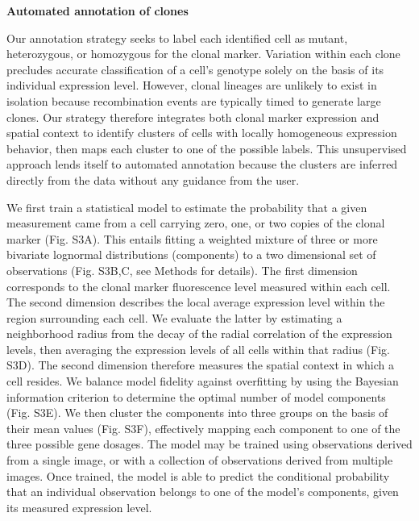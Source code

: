 \textbf{Automated annotation of clones}

Our annotation strategy seeks to label each identified cell as mutant, heterozygous, or homozygous for the clonal marker. Variation within each clone precludes accurate classification of a cell's genotype solely on the basis of its individual expression level. However, clonal lineages are unlikely to exist in isolation because recombination events are typically timed to generate large clones. Our strategy therefore integrates both clonal marker expression and spatial context to identify clusters of cells with locally homogeneous expression behavior, then maps each cluster to one of the possible labels. This unsupervised approach lends itself to automated annotation because the clusters are inferred directly from the data without any guidance from the user.

We first train a statistical model to estimate the probability that a given measurement came from a cell carrying zero, one, or two copies of the clonal marker (Fig. S3A). This entails fitting a weighted mixture of three or more bivariate lognormal distributions (components) to a two dimensional set of observations (Fig. S3B,C, see Methods for details). The first dimension corresponds to the clonal marker fluorescence level measured within each cell. The second dimension describes the local average expression level within the region surrounding each cell. We evaluate the latter by estimating a neighborhood radius from the decay of the radial correlation of the expression levels, then averaging the expression levels of all cells within that radius (Fig. S3D). The second dimension therefore measures the spatial context in which a cell resides. We balance model fidelity against overfitting by using the Bayesian information criterion to determine the optimal number of model components (Fig. S3E). We then cluster the components into three groups on the basis of their mean values (Fig. S3F), effectively mapping each component to one of the three possible gene dosages. The model may be trained using observations derived from a single image, or with a collection of observations derived from multiple images. Once trained, the model is able to predict the conditional probability that an individual observation belongs to one of the model's components, given its measured expression level.

